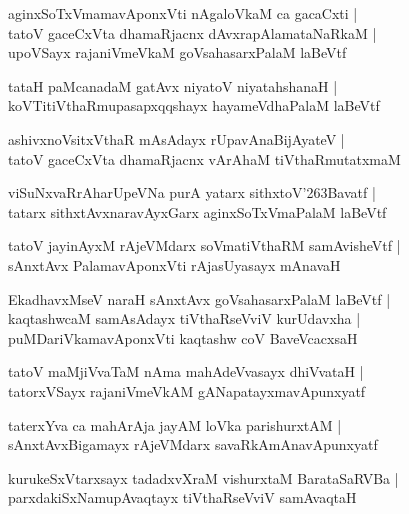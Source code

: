 \documentclass[twoside,12pt,openright]{book}
\def\S{\char'263}
\newcounter{shloka}[chapter]
\begin{document}
\begin{shloka}
aginxSoTxVmamavAponxVti nAgaloVkaM ca gacaCxti |\\
tatoV gaceCxVta dhamaRjacnx dAvxrapAlamataNaRkaM |\\
upoVSayx rajaniVmeVkaM goVsahasarxPalaM laBeVtf 
\end{shloka}

\begin{shloka}
tataH paMcanadaM gatAvx niyatoV niyatahshanaH |\\
koVTitiVthaRmupasapxqqshayx hayameVdhaPalaM laBeVtf
\end{shloka}

\begin{shloka}
ashivxnoVsitxVthaR mAsAdayx rUpavAnaBijAyateV |\\
tatoV gaceCxVta dhamaRjacnx vArAhaM tiVthaRmutatxmaM 
\end{shloka}

\begin{shloka}
viSuNxvaRrAharUpeVNa purA yatarx sithxtoV\S Bavatf |\\
tatarx sithxtAvxnaravAyxGarx aginxSoTxVmaPalaM laBeVtf 
\end{shloka}

\begin{shloka}
tatoV jayinAyxM rAjeVMdarx soVmatiVthaRM samAvisheVtf |\\
sAnxtAvx PalamavAponxVti rAjasUyasayx mAnavaH 
\end{shloka}


\begin{shloka}
EkadhavxMseV naraH sAnxtAvx goVsahasarxPalaM laBeVtf |\\
kaqtashwcaM samAsAdayx tiVthaRseVviV kurUdavxha |\\
puMDariVkamavAponxVti kaqtashw coV BaveVcacxsaH
\end{shloka}

\begin{shloka}
tatoV maMjiVvaTaM nAma mahAdeVvasayx dhiVvataH |\\
tatorxVSayx rajaniVmeVkAM gANapatayxmavApunxyatf 
\end{shloka}

\begin{shloka}
taterxYva ca mahArAja jayAM loVka parishurxtAM |\\
sAnxtAvxBigamayx rAjeVMdarx savaRkAmAnavApunxyatf 
\end{shloka}

\begin{shloka}
kurukeSxVtarxsayx  tadadxvXraM vishurxtaM BarataSaRVBa |\\
parxdakiSxNamupAvaqtayx tiVthaRseVviV samAvaqtaH
\end{shloka}
\end{document}

